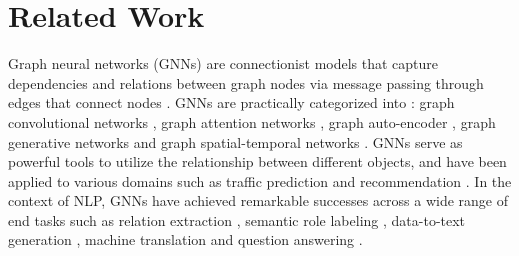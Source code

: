 \documentclass[11pt,a4paper]{article}
\begin{document}
\section{Related Work}
\begin{comment}
\paragraph{Transductive Learning}~{}\newline
Transductive learning \citep{Vapnik1998} differs from inductive learning in terms of that transductive learning makes use of unlabeled test examples in the training process. Early literature for transductive text classification usually uses feature based models such as SVMs \citep{joachims1999transductive,bruzzone2006novel}, SVD \citep{sarah2004} and NNs \citep{joachims2003transductive} to incorporate the unlabeled test set as additional source information during training.
Particularly, graph-based methods have exhibited their effectiveness in transductive learning.
Label propagation \citep{zhu2003semi} and PageRank \citep{page1999pagerank} respectively models the entire graph by passing label information and feature information through edges between nodes in graphs. In this way, even unlabeled test examples can benefit from label and feature propagation.
DeepWalk \citep{10.1145/2623330.2623732} applied neural embeddings to model graphs. It learns graph embeddings by predicting local nodes in the neighborhood sampled from random walks on the graph.
\citet{weston2012deep,yang2016revisiting} extended the idea of graph embeddings to semi-supervised learning by either using a regularizer to the graph structure or predicting the graph context.
\end{comment}

Graph neural networks (GNNs) are connectionist models that capture dependencies and relations between graph nodes via message passing through edges that connect nodes \citep{scarselli2008graph,hamilton2017inductive,xu2018powerful}. GNNs are practically categorized into \citep{wu2020comprehensive}: graph convolutional networks \citep{kipf2016semi,wu2019simplifying}, graph attention networks \citep{velivckovic2017graph,zhang2018gaan}, graph auto-encoder \citep{cao2016deep,kipf2016variational}, graph generative networks \citep{de2018molgan,li2018learning} and graph spatial-temporal networks \citep{li2017diffusion,yu2017spatio}. 
GNNs serve as powerful tools to utilize the relationship between different objects, and have been applied to various domains such as traffic prediction \citep{yu2018spatio,zhang2018gaan} and recommendation \citep{zhang2020comprehensive,monti2017geometric}.
In the context of NLP, GNNs have achieved remarkable successes across a wide range of end tasks such as relation extraction \citep{zhang2018graph}, semantic role labeling \citep{marcheggiani-titov-2017-encoding}, data-to-text generation \citep{marcheggiani-perez-beltrachini-2018-deep}, machine translation \citep{bastings-etal-2017-graph} and question answering \citep{song2018exploring,de2018question}.
\end{document}
